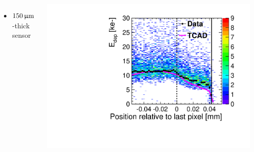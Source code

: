 \begin{frame}
\begin{columns}
    \begin{itemize}
    \item $150\,\upmu\mathrm{m}$-thick sensor
    \end{itemize}
    \centering
    \includegraphics[width=\textwidth]{../figures/ActiveEdge/55_GNDGR_150_Edep_TCAD_data.pdf}
  \end{columns}

\end{frame}

